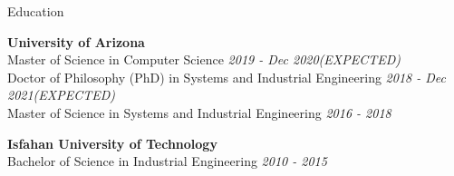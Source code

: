 \documentclass{resume} %
\begin{document}
\begin{rSection}{Education}

%
%
%

{\bf University of Arizona}
\\ Master of Science in Computer Science  \hfill {\em 2019 - Dec 2020(EXPECTED)} 
\\ Doctor of Philosophy (PhD) in Systems and Industrial Engineering \hfill {\em 2018 - Dec 2021(EXPECTED)} 
\\ Master of Science in Systems and Industrial Engineering \hfill {\em 2016 - 2018} 

{\bf Isfahan University of Technology}
\\ Bachelor of Science in Industrial Engineering  \hfill {\em 2010 - 2015} 

\end{rSection}
\end{document}
